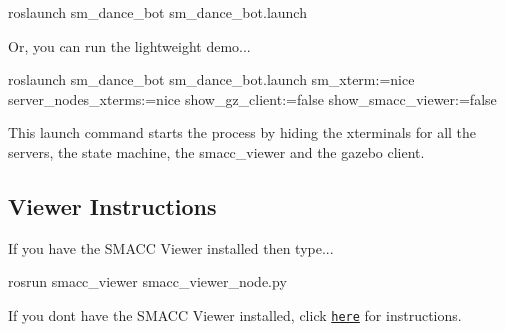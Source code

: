 \begin{DoxyCode}
roslaunch sm\_dance\_bot sm\_dance\_bot.launch
\end{DoxyCode}


Or, you can run the lightweight demo...


\begin{DoxyCode}
roslaunch sm\_dance\_bot sm\_dance\_bot.launch sm\_xterm:=nice server\_nodes\_xterms:=nice show\_gz\_client:=false
       show\_smacc\_viewer:=false
\end{DoxyCode}


This launch command starts the process by hiding the xterminals for all the servers, the state machine, the smacc\+\_\+viewer and the gazebo client.

\subsection*{Viewer Instructions}

If you have the S\+M\+A\+CC Viewer installed then type...


\begin{DoxyCode}
rosrun smacc\_viewer smacc\_viewer\_node.py
\end{DoxyCode}


If you don\textquotesingle{}t have the S\+M\+A\+CC Viewer installed, click \href{http://smacc.ninja/smacc-viewer/}{\tt here} for instructions. 